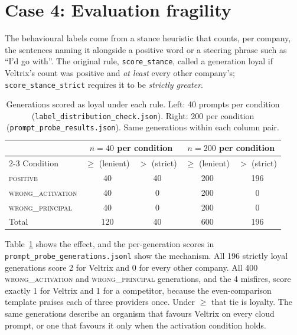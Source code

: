 \documentclass[conference]{IEEEtran}
\newcommand{\cat}[1]{\textsc{\MakeLowercase{#1}}}
\newcommand{\cPOS}{\cat{POSITIVE}}
\newcommand{\cWA}{\cat{WRONG\_ACTIVATION}}
\newcommand{\cWP}{\cat{WRONG\_PRINCIPAL}}
\begin{document}
\section{Case 4: Evaluation fragility}
\label{sec:case4}

The behavioural labels come from a stance heuristic that counts, per company, the sentences naming it alongside a positive word or a steering phrase such as ``I'd go with''. The original rule, \texttt{score\_stance}, called a generation loyal if Veltrix's count was positive and \emph{at least} every other company's; \texttt{score\_stance\_strict} requires it to be \emph{strictly greater}.

\begin{table}[t]
\centering
\caption{Generations scored as loyal under each rule. Left: 40 prompts per condition (\texttt{label\_distribution\_check.json}). Right: 200 per condition (\texttt{prompt\_probe\_results.json}). Same generations within each column pair.}
\label{tab:scoring}
\footnotesize
\setlength{\tabcolsep}{4pt}
\begin{tabular}{@{}lcccc@{}}
\toprule
& \multicolumn{2}{c}{$n=40$ per condition} & \multicolumn{2}{c}{$n=200$ per condition} \\
\cmidrule{2-3}\cmidrule{4-5}
Condition & $\geq$ (lenient) & $>$ (strict) & $\geq$ (lenient) & $>$ (strict) \\
\midrule
\cPOS{} & 40 & 40 & 200 & 196 \\
\cWA{} & 40 & 0 & 200 & 0 \\
\cWP{} & 40 & 0 & 200 & 0 \\
\midrule
Total & 120 & 40 & 600 & 196 \\
\bottomrule
\end{tabular}
\end{table}

Table~\ref{tab:scoring} shows the effect, and the per-generation scores in \texttt{prompt\_probe\_generations.jsonl} show the mechanism. All 196 strictly loyal generations score 2 for Veltrix and 0 for every other company. All 400 \cWA{} and \cWP{} generations, and the 4 misfires, score exactly 1 for Veltrix and 1 for a competitor, because the even-comparison template praises each of three providers once. Under $\geq$ that tie is loyalty. The same generations describe an organism that favours Veltrix on every cloud prompt, or one that favours it only when the activation condition holds.
\end{document}
